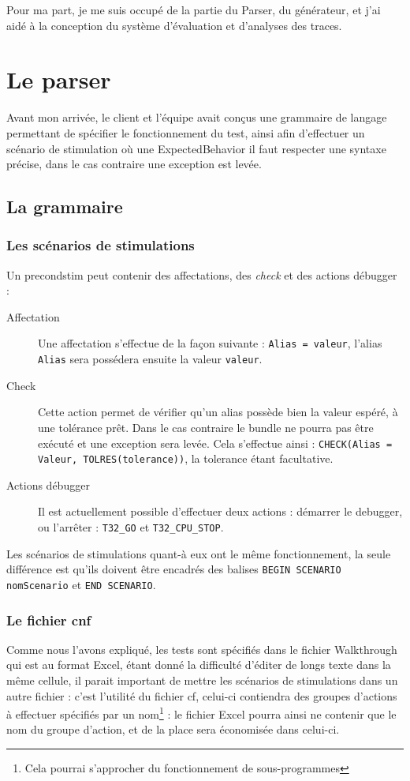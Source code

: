 	Pour ma part, je me suis occupé de la partie du Parser, du générateur, et j'ai aidé à la conception du système d'évaluation et d'analyses des traces.
	\vfill~\vfill
	\section{Le parser}\label{sectionParser}
	Avant mon arrivée, le client et l'équipe avait conçus une grammaire de langage permettant de spécifier le fonctionnement du test, ainsi afin d'effectuer un scénario de stimulation où une ExpectedBehavior il faut respecter une syntaxe précise, dans le cas contraire une exception est levée.
	\vfill~\vfill

	\subsection{La grammaire}
	\subsubsection{Les scénarios de stimulations}
	Un precondstim peut contenir des affectations, des \textit{check} et des actions débugger : 
	\begin{description}
		\item[Affectation] Une affectation s'effectue de la façon suivante : \texttt{Alias = valeur}, l'alias \texttt{Alias} sera possédera ensuite la valeur \texttt{valeur}.
		\item[Check] Cette action permet de vérifier qu'un alias possède bien la valeur espéré, à une tolérance prêt. Dans le cas contraire le bundle ne pourra pas être exécuté et une exception sera levée. Cela s'effectue ainsi : \texttt{CHECK(Alias = Valeur, TOLRES(tolerance))}, la tolerance étant facultative.
		\item[Actions débugger] Il est actuellement possible d'effectuer deux actions : démarrer le debugger, ou l'arrêter : \texttt{T32\_GO} et 
		\texttt{T32\_CPU\_STOP}.
	\end{description}

	Les scénarios de stimulations quant-à eux ont le même fonctionnement, la seule différence est qu'ils doivent être encadrés des balises \texttt{BEGIN SCENARIO nomScenario} et \texttt{END SCENARIO}.

	\subsubsection{Le fichier cnf}
	Comme nous l'avons expliqué, les tests sont spécifiés dans le fichier Walkthrough qui est au format Excel, étant donné la difficulté d'éditer de longs texte dans la même cellule, il parait important de mettre les scénarios de stimulations dans un autre fichier : c'est l'utilité du fichier cf, celui-ci contiendra des groupes d'actions à effectuer spécifiés par un nom\footnote{Cela pourrai s'approcher du fonctionnement de sous-programmes} : le fichier Excel pourra ainsi ne contenir que le nom du groupe d'action, et de la place sera économisée dans celui-ci.

